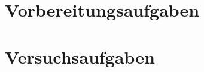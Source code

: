 \documentclass[a4paper, 12pt]{article}
\begin{document}
  
  \clearpage
  \setcounter{page}{1}

\section{Vorbereitungsaufgaben}



\pagebreak

  \clearpage
\setcounter{page}{1}

\setcounter{section}{0}
\section{Versuchsaufgaben}
\end{document}
